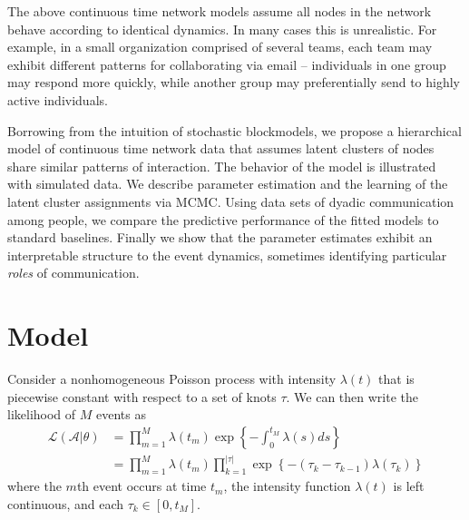 \documentclass{article}
\begin{document}
The above continuous time network models assume all nodes in the network behave according to identical dynamics.  In many cases this is unrealistic.  For example, in a small organization comprised of several teams, each team may exhibit different patterns for collaborating via email --  individuals in one group may respond more quickly, while another group may preferentially send to highly active individuals.  %

Borrowing from the intuition of stochastic blockmodels, we propose a hierarchical model of continuous time network data that assumes latent clusters of nodes share similar patterns of interaction.  The behavior of the model is illustrated with simulated data.  We describe parameter estimation and the learning of the latent cluster assignments via MCMC.  Using data sets of dyadic communication among people, we compare the predictive performance of the fitted models to standard baselines.  Finally we show that the parameter estimates exhibit an interpretable structure to the event dynamics, sometimes identifying particular \emph{roles} of communication.
  
\section{Model}

Consider a nonhomogeneous Poisson process with  intensity $\lambda(t)$ that is piecewise constant with respect to a set of knots $\tau$.  We can then write the likelihood of $M$ events as
\begin{align}
\mathcal{L}(\mathcal{A}|\theta) &= \prod_{m=1}^M \lambda(t_m) \exp\left\{ - \int_{0}^{t_M} \lambda(s)ds \right\} \\
&= \prod_{m=1}^M \lambda(t_m) \prod_{k=1}^{|\tau|} \exp\left\{ - (\tau_{k} - \tau_{k-1}) \lambda(\tau_k) \right\}
\end{align}
\noindent where the $m$th event occurs at time $t_m$, the intensity function $\lambda(t)$ is left continuous, and each $\tau_k \in [0,t_M]$.
\end{document}
